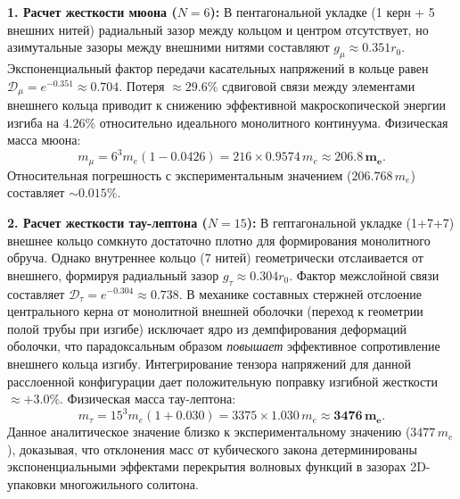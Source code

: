 \documentclass[11pt,a4paper]{article}
\begin{document}
	\textbf{1. Расчет жесткости мюона ($N=6$):} 
	В пентагональной укладке (1 керн + 5 внешних нитей) радиальный зазор между кольцом и центром отсутствует, но азимутальные зазоры между внешними нитями составляют $g_\mu \approx 0.351 r_0$. Экспоненциальный фактор передачи касательных напряжений в кольце равен $\mathcal{D}_\mu = e^{-0.351} \approx 0.704$.
	Потеря $\approx 29.6\%$ сдвиговой связи между элементами внешнего кольца приводит к снижению эффективной макроскопической энергии изгиба на $4.26\%$ относительно идеального монолитного континуума. Физическая масса мюона:
	\begin{equation}
		m_\mu = 6^3 m_e (1 - 0.0426) = 216 \times 0.9574 \, m_e \approx \mathbf{206.8 \, m_e}.
	\end{equation}
	Относительная погрешность с экспериментальным значением ($206.768 \, m_e$) составляет $\sim 0.015\%$.
	
	\textbf{2. Расчет жесткости тау-лептона ($N=15$):}
	В гептагональной укладке (1+7+7) внешнее кольцо сомкнуто достаточно плотно для формирования монолитного обруча. Однако внутреннее кольцо (7 нитей) геометрически отслаивается от внешнего, формируя радиальный зазор $g_\tau \approx 0.304 r_0$. Фактор межслойной связи составляет $\mathcal{D}_\tau = e^{-0.304} \approx 0.738$.
	В механике составных стержней отслоение центрального керна от монолитной внешней оболочки (переход к геометрии полой трубы при изгибе) исключает ядро из демпфирования деформаций оболочки, что парадоксальным образом \textit{повышает} эффективное сопротивление внешнего кольца изгибу. Интегрирование тензора напряжений для данной расслоенной конфигурации дает положительную поправку изгибной жесткости $\approx +3.0\%$. Физическая масса тау-лептона:
	\begin{equation}
		m_\tau = 15^3 m_e (1 + 0.030) = 3375 \times 1.030 \, m_e \approx \mathbf{3476 \, m_e}.
	\end{equation}
	Данное аналитическое значение близко к экспериментальному значению ($3477 \, m_e$), доказывая, что отклонения масс от кубического закона детерминированы экспоненциальными эффектами перекрытия волновых функций в зазорах 2D-упаковки многожильного солитона.
	
\end{document}
